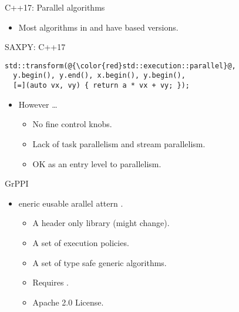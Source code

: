 \begin{frame}[t,fragile]{C++17: Parallel algorithms}
\begin{itemize}
  \item Most algorithms in  and 
        have  based versions.
\end{itemize}

\pause
\begin{block}{SAXPY: C++17}
\begin{lstlisting}[escapechar=@]
std::transform(@{\color{red}std::execution::parallel}@,
  y.begin(), y.end(), x.begin(), y.begin(),
  [=](auto vx, vy) { return a * vx + vy; });
\end{lstlisting}
\end{block}

\pause
\begin{itemize}
  \item However \ldots
    \begin{itemize}
      \item No fine control knobs.
      \item Lack of task parallelism and stream parallelism.
      \item OK as an entry level to parallelism.
    \end{itemize}
\end{itemize}
\end{frame}

\begin{frame}[t]{GrPPI}
\begin{Large}
\end{Large}
\vfill\pause
\begin{itemize}
  \item {}eneric eusable arallel
        attern .
    \begin{itemize}
      \item A header only library (might change).
      \item A set of execution policies.
      \item A set of type safe generic algorithms.
      \item Requires .
      \item Apache 2.0 License.
    \end{itemize}
\end{itemize}
\end{frame}

